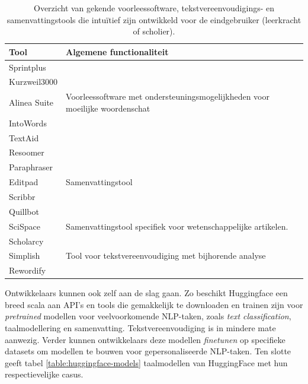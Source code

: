 \begin{center}
	\begin{table}[H]
		\begin{tabular}{ | m{4cm} | m{12cm} | } 
		\hline
		\textbf{Tool} & Algemene functionaliteit \\
		\hline
		Sprintplus & \\
		Kurzweil3000 & \\
		Alinea Suite & Voorleessoftware met ondersteuningsmogelijkheden voor moeilijke woordenschat \\
		IntoWords & \\
		TextAid & \\
		\hline
		Resoomer &  \\
		Paraphraser & \\
		Editpad & Samenvattingstool \\
		Scribbr & \\
		Quillbot & \\
		\hline
		SciSpace & Samenvattingstool specifiek voor wetenschappelijke artikelen. \\
		Scholarcy & \\
		\hline
		Simplish & Tool voor tekstvereenvoudiging met bijhorende analyse\\
		Rewordify & \\
		\hline
		\end{tabular}
	\caption{Overzicht van gekende voorleessoftware, tekstvereenvoudigings- en samenvattingstools die intuïtief zijn ontwikkeld voor de eindgebruiker (leerkracht of scholier).}
	\label{table:overview-tools}
	\end{table}
\end{center}

\medspace

Ontwikkelaars kunnen ook zelf aan de slag gaan. Zo beschikt Huggingface een breed scala aan API's en tools die gemakkelijk te downloaden en trainen zijn voor \textit{pretrained} modellen voor veelvoorkomende NLP-taken, zoals \textit{text classification}, taalmodellering en samenvatting. Tekstvereenvoudiging is in mindere mate aanwezig. Verder kunnen ontwikkelaars deze modellen \textit{finetunen} op specifieke datasets om modellen te bouwen voor gepersonaliseerde NLP-taken. Ten slotte geeft tabel \ref{table:huggingface-models} taalmodellen van HuggingFace met hun respectievelijke casus.

\medspace

